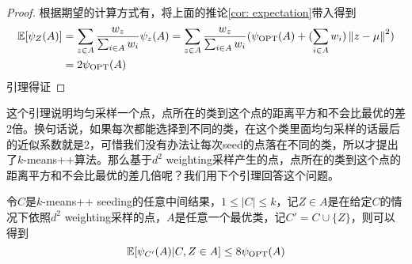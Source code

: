 \begin{proof}
    根据期望的计算方式有，将上面的推论\ref{cor: expectation}带入得到
    \begin{align*}
        \mathbb{E}[\psi_Z(A)] &= \sum_{z \in A} \frac{w_z}{\sum_{i \in A} w_i} \psi_z(A) = \sum_{z \in A} \frac{w_z}{\sum_{i \in A} w_i} (\psi_{\text{OPT}}(A)+(\sum_{i \in A}w_i) \left\lVert z-\mu\right\rVert^2) \\
        &= 2 \psi_{\text{OPT}}(A)
    \end{align*}
    引理得证
\end{proof}
这个引理说明均匀采样一个点，点所在的类到这个点的距离平方和不会比最优的差2倍。换句话说，如果每次都能选择到不同的类，在这个类里面均匀采样的话最后的近似系数就是2，可惜我们没有办法让每次seed的点落在不同的类，所以才提出了$k$-means++算法。那么基于$d^2$ weighting采样产生的点，点所在的类到这个点的距离平方和不会比最优的差几倍呢？我们用下个引理回答这个问题。
\begin{lemma}
    \label{lem: 8OPT_A}
    令$C$是$k$-means++ seeding的任意中间结果，$1 \leq |C| \leq k$，记$Z \in A$是在给定$C$的情况下依照$d^2$ weighting采样的点，$A$是任意一个最优类，记$C' = C \cup \{Z\}$，则可以得到
    \begin{equation*}
        \mathbb{E}[\psi_{C'}(A)|C,Z \in A] \leq 8 \psi_{\text{OPT}}(A)
    \end{equation*}
\end{lemma}
